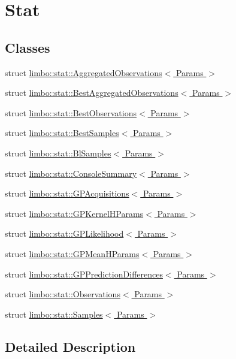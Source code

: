\hypertarget{group__stat}{}\section{Stat}
\label{group__stat}
\subsection*{Classes}
\begin{DoxyCompactItemize}
\item 
struct \hyperlink{structlimbo_1_1stat_1_1_aggregated_observations}{limbo\+::stat\+::\+Aggregated\+Observations$<$ Params $>$}
\item 
struct \hyperlink{structlimbo_1_1stat_1_1_best_aggregated_observations}{limbo\+::stat\+::\+Best\+Aggregated\+Observations$<$ Params $>$}
\item 
struct \hyperlink{structlimbo_1_1stat_1_1_best_observations}{limbo\+::stat\+::\+Best\+Observations$<$ Params $>$}
\item 
struct \hyperlink{structlimbo_1_1stat_1_1_best_samples}{limbo\+::stat\+::\+Best\+Samples$<$ Params $>$}
\item 
struct \hyperlink{structlimbo_1_1stat_1_1_bl_samples}{limbo\+::stat\+::\+Bl\+Samples$<$ Params $>$}
\item 
struct \hyperlink{structlimbo_1_1stat_1_1_console_summary}{limbo\+::stat\+::\+Console\+Summary$<$ Params $>$}
\item 
struct \hyperlink{structlimbo_1_1stat_1_1_g_p_acquisitions}{limbo\+::stat\+::\+G\+P\+Acquisitions$<$ Params $>$}
\item 
struct \hyperlink{structlimbo_1_1stat_1_1_g_p_kernel_h_params}{limbo\+::stat\+::\+G\+P\+Kernel\+H\+Params$<$ Params $>$}
\item 
struct \hyperlink{structlimbo_1_1stat_1_1_g_p_likelihood}{limbo\+::stat\+::\+G\+P\+Likelihood$<$ Params $>$}
\item 
struct \hyperlink{structlimbo_1_1stat_1_1_g_p_mean_h_params}{limbo\+::stat\+::\+G\+P\+Mean\+H\+Params$<$ Params $>$}
\item 
struct \hyperlink{structlimbo_1_1stat_1_1_g_p_prediction_differences}{limbo\+::stat\+::\+G\+P\+Prediction\+Differences$<$ Params $>$}
\item 
struct \hyperlink{structlimbo_1_1stat_1_1_observations}{limbo\+::stat\+::\+Observations$<$ Params $>$}
\item 
struct \hyperlink{structlimbo_1_1stat_1_1_samples}{limbo\+::stat\+::\+Samples$<$ Params $>$}
\end{DoxyCompactItemize}


\subsection{Detailed Description}
